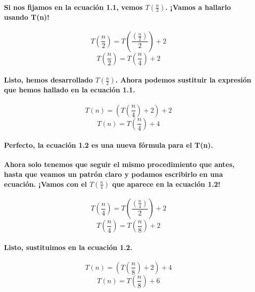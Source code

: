 \documentclass{book}
\begin{document}
      \paragraph{Si nos fijamos en la ecuación 1.1, vemos $T(\frac{n}{2})$. ¡Vamos a hallarlo usando T(n)!}
	\begin{equation}	
		T(\frac{n}{2}) = T(\frac{(\frac{n}{2})}{2}) + 2 \nonumber
	\end{equation}	
	\begin{equation}	
		T(\frac{n}{2}) = T(\frac{n}{4}) + 2 \nonumber 
	\end{equation}	
	\paragraph{Listo, hemos desarrollado $T(\frac{n}{2})$. Ahora podemos sustituir la expresión que hemos hallado en la ecuación 1.1.}
	\begin{equation}	
		T(n) = (T(\frac{n}{4}) + 2) + 2 \nonumber 
	\end{equation}	
	\begin{equation}	
		T(n) = T(\frac{n}{4}) + 4 
	\end{equation}	
	\paragraph{Perfecto, la ecuación 1.2 es una nueva fórmula para el T(n).}
	\paragraph{Ahora solo tenemos que seguir el mismo procedimiento que antes, hasta que veamos un patrón claro y podamos escribirlo en una ecuación. ¡Vamos con el $T(\frac{n}{4})$ que aparece en la ecuación 1.2!}
	\begin{equation}	
		T(\frac{n}{4}) = T(\frac{(\frac{n}{4})}{2}) + 2 \nonumber 
	\end{equation}
	\begin{equation}
		T(\frac{n}{4}) = T(\frac{n}{8}) + 2 \nonumber 
	\end{equation}
	\paragraph{Listo, sustituimos en la ecuación 1.2.}
	\begin{equation}
		T(n) = (T(\frac{n}{8}) + 2) + 4 \nonumber  
	\end{equation}
	\begin{equation}
		T(n) = T(\frac{n}{8}) + 6 
	\end{equation}
\end{document}
